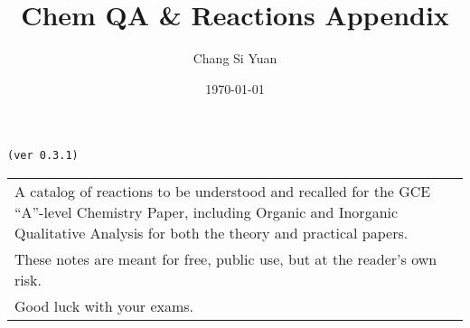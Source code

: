\documentclass[../main]{subfiles}
\begin{document}
\author{Chang Si Yuan}
\title{Chem QA \& Reactions Appendix}
\date{\today}

\maketitle

\begin{center}

	\texttt{(ver 0.3.1)}

	\vspace{50pt}

	\begin{tabular}{>{\flushleft}p{8cm}}
	A catalog of reactions to be understood and recalled for the GCE ``A''-level Chemistry Paper, including Organic and Inorganic Qualitative Analysis for both the theory and practical papers. \\
	These notes are meant for free, public use, but at the reader's own risk. \\
	Good luck with your exams.
	\end{tabular}

\end{center}

\newpage
\end{document}

